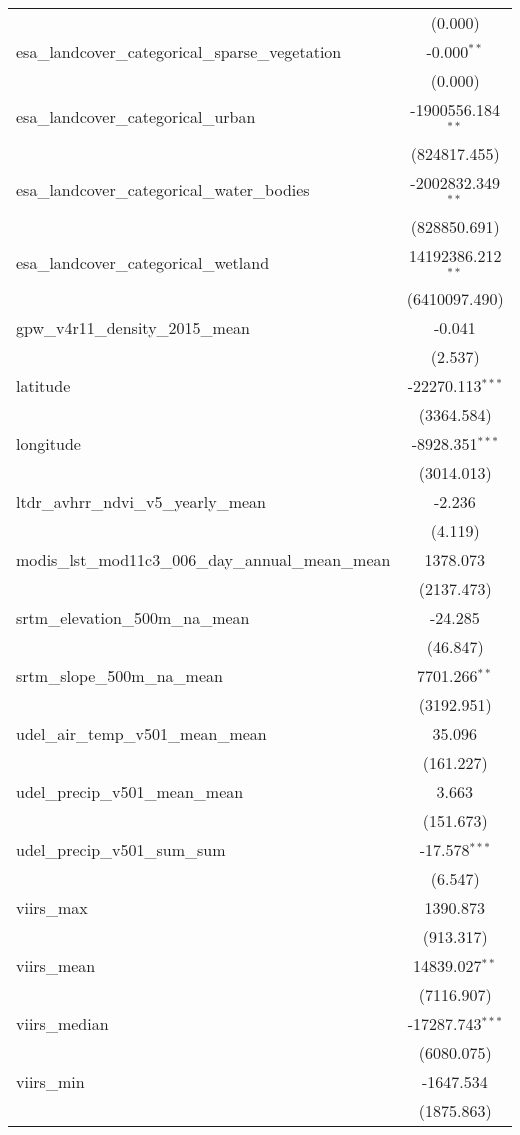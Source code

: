 \begin{table}[!htbp]
\begin{tabular}{@{\extracolsep{5pt}}lc}
  & (0.000) \\
 esa_landcover_categorical_sparse_vegetation & -0.000$^{**}$ \\
  & (0.000) \\
 esa_landcover_categorical_urban & -1900556.184$^{**}$ \\
  & (824817.455) \\
 esa_landcover_categorical_water_bodies & -2002832.349$^{**}$ \\
  & (828850.691) \\
 esa_landcover_categorical_wetland & 14192386.212$^{**}$ \\
  & (6410097.490) \\
 gpw_v4r11_density_2015_mean & -0.041$^{}$ \\
  & (2.537) \\
 latitude & -22270.113$^{***}$ \\
  & (3364.584) \\
 longitude & -8928.351$^{***}$ \\
  & (3014.013) \\
 ltdr_avhrr_ndvi_v5_yearly_mean & -2.236$^{}$ \\
  & (4.119) \\
 modis_lst_mod11c3_006_day_annual_mean_mean & 1378.073$^{}$ \\
  & (2137.473) \\
 srtm_elevation_500m_na_mean & -24.285$^{}$ \\
  & (46.847) \\
 srtm_slope_500m_na_mean & 7701.266$^{**}$ \\
  & (3192.951) \\
 udel_air_temp_v501_mean_mean & 35.096$^{}$ \\
  & (161.227) \\
 udel_precip_v501_mean_mean & 3.663$^{}$ \\
  & (151.673) \\
 udel_precip_v501_sum_sum & -17.578$^{***}$ \\
  & (6.547) \\
 viirs_max & 1390.873$^{}$ \\
  & (913.317) \\
 viirs_mean & 14839.027$^{**}$ \\
  & (7116.907) \\
 viirs_median & -17287.743$^{***}$ \\
  & (6080.075) \\
 viirs_min & -1647.534$^{}$ \\
  & (1875.863) \\

\end{tabular}
\end{table}
